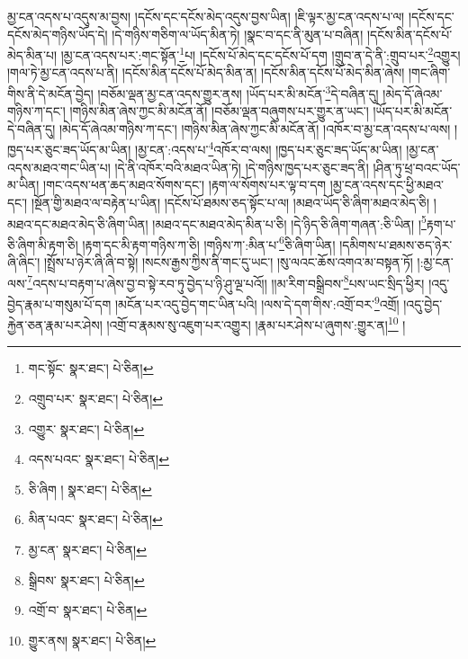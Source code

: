 མྱ་ངན་འདས་པ་འདུས་མ་བྱས། །དངོས་དང་དངོས་མེད་འདུས་བྱས་ཡིན། །ཇི་ལྟར་མྱ་ངན་འདས་པ་ལ། །དངོས་དང་དངོས་མེད་གཉིས་ཡོད་དེ། །དེ་གཉིས་གཅིག་ལ་ཡོད་མིན་ཏེ། །སྣང་བ་དང་ནི་མུན་པ་བཞིན། །དངོས་མིན་དངོས་པོ་མེད་མིན་པ། །མྱ་ངན་འདས་པར་:གང་སྟོན་\footnote{གང་སྟོང་  སྣར་ཐང་།  པེ་ཅིན། }པ། །དངོས་པོ་མེད་དང་དངོས་པོ་དག །གྲུབ་ན་དེ་ནི་:གྲུབ་པར་\footnote{འགྲུབ་པར་  སྣར་ཐང་།  པེ་ཅིན། }འགྱུར། །གལ་ཏེ་མྱ་ངན་འདས་པ་ནི། །དངོས་མིན་དངོས་པོ་མེད་མིན་ན། །དངོས་མིན་དངོས་པོ་མེད་མིན་ཞེས། །གང་ཞིག་གིས་ནི་དེ་མངོན་བྱེད། །བཅོམ་ལྡན་མྱ་ངན་འདས་གྱུར་ནས། །ཡོད་པར་མི་མངོན་\footnote{འགྱུར་  སྣར་ཐང་།  པེ་ཅིན། }དེ་བཞིན་དུ། །མེད་དོ་ཞེའམ་གཉིས་ཀ་དང་། །གཉིས་མིན་ཞེས་ཀྱང་མི་མངོན་ནོ། །བཅོམ་ལྡན་བཞུགས་པར་གྱུར་ན་ཡང་། །ཡོད་པར་མི་མངོན་དེ་བཞིན་དུ། །མེད་དོ་ཞེའམ་གཉིས་ཀ་དང་། །གཉིས་མིན་ཞེས་ཀྱང་མི་མངོན་ནོ། །འཁོར་བ་མྱ་ངན་འདས་པ་ལས། །ཁྱད་པར་ཅུང་ཟད་ཡོད་མ་ཡིན། །མྱ་ངན་:འདས་པ་\footnote{འདས་པའང་  སྣར་ཐང་།  པེ་ཅིན། }འཁོར་བ་ལས། །ཁྱད་པར་ཅུང་ཟད་ཡོད་མ་ཡིན། །མྱ་ངན་འདས་མཐའ་གང་ཡིན་པ། །དེ་ནི་འཁོར་བའི་མཐའ་ཡིན་ཏེ། །དེ་གཉིས་ཁྱད་པར་ཅུང་ཟད་ནི། །ཤིན་ཏུ་ཕྲ་བའང་ཡོད་མ་ཡིན། །གང་འདས་ཕན་ཆད་མཐའ་སོགས་དང་། །རྟག་ལ་སོགས་པར་ལྟ་བ་དག །མྱ་ངན་འདས་དང་ཕྱི་མཐའ་དང་། །སྔོན་གྱི་མཐའ་ལ་བརྟེན་པ་ཡིན། །དངོས་པོ་ཐམས་ཅད་སྟོང་པ་ལ། །མཐའ་ཡོད་ཅི་ཞིག་མཐའ་མེད་ཅི། །མཐའ་དང་མཐའ་མེད་ཅི་ཞིག་ཡིན། །མཐའ་དང་མཐའ་མེད་མིན་པ་ཅི། །དེ་ཉིད་ཅི་ཞིག་གཞན་:ཅི་ཡིན། །\footnote{ཅི་ཞིག །  སྣར་ཐང་།  པེ་ཅིན། }རྟག་པ་ཅི་ཞིག་མི་རྟག་ཅི། །རྟག་དང་མི་རྟག་གཉིས་ཀ་ཅི། །གཉིས་ཀ་:མིན་པ་\footnote{མིན་པའང་  སྣར་ཐང་།  པེ་ཅིན། }ཅི་ཞིག་ཡིན། །དམིགས་པ་ཐམས་ཅད་ཉེར་ཞི་ཞིང་། །སྤྲོས་པ་ཉེར་ཞི་ཞི་བ་སྟེ། །སངས་རྒྱས་ཀྱིས་ནི་གང་དུ་ཡང་། །སུ་ལའང་ཆོས་འགའ་མ་བསྟན་ཏོ། །:མྱ་ངན་ལས་\footnote{མྱ་ངན་  སྣར་ཐང་།  པེ་ཅིན། }འདས་པ་བརྟག་པ་ཞེས་བྱ་བ་སྟེ་རབ་ཏུ་བྱེད་པ་ཉི་ཤུ་ལྔ་པའོ།། །།མ་རིག་བསྒྲིབས་\footnote{སྒྲིབས་  སྣར་ཐང་།  པེ་ཅིན། }པས་ཡང་སྲིད་ཕྱིར། །འདུ་བྱེད་རྣམ་པ་གསུམ་པོ་དག །མངོན་པར་འདུ་བྱེད་གང་ཡིན་པའི། །ལས་དེ་དག་གིས་:འགྲོ་བར་\footnote{འགྲོ་བ་  སྣར་ཐང་།  པེ་ཅིན། }འགྲོ། །འདུ་བྱེད་རྐྱེན་ཅན་རྣམ་པར་ཤེས། །འགྲོ་བ་རྣམས་སུ་འཇུག་པར་འགྱུར། །རྣམ་པར་ཤེས་པ་ཞུགས་:གྱུར་ན།\footnote{གྱུར་ནས།  སྣར་ཐང་།  པེ་ཅིན། } །
